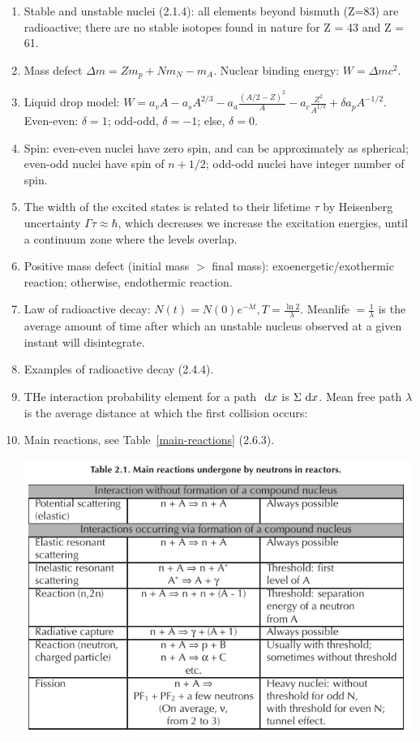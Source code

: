 \documentclass{school-22.211-notes}
\begin{document}
\begin{enumerate}
\item Stable and unstable nuclei (2.1.4): all elements beyond bismuth (Z=83) are radioactive; there are no stable isotopes found in nature for Z = 43 and Z = 61. 
\item Mass defect $\Delta m = Z m_p + N m_N - m_A$. Nuclear binding energy: $W = \Delta m c^2$. 
\item Liquid drop model: $W = a_v A - a_s A^{2/3} - a_a \frac{(A/2 - Z)^2}{A} - a_c \frac{Z^2}{A^{1/3}} + \delta a_p A^{-1/2}.$ Even-even: $\delta = 1$; odd-odd, $\delta = -1$; else, $\delta = 0$. 
\item Spin: even-even nuclei have zero spin, and can be approximately as spherical; even-odd nuclei have spin of $n+1/2$; odd-odd nuclei have integer number of spin. 
\item The width of the excited states is related to their lifetime $\tau$ by Heisenberg uncertainty $\Gamma \tau \approx \hbar$, which decreases we increase the excitation energies, until a continuum zone where the levels overlap. 
\item Positive mass defect (initial mass $>$ final mass): exoenergetic/exothermic reaction; otherwise, endothermic reaction. 
\item Law of radioactive decay: $N(t) = N(0) e^{-\lambda t}, T = \frac{\ln 2}{\lambda}$. Meanlife $=\frac{1}{\lambda}$ is the average amount of time after which an unstable nucleus observed at a given instant will disintegrate.  
\item Examples of radioactive decay (2.4.4).
\item THe interaction probability element for a path $\mbox{ }\mathrm{d} x$ is $\Sigma \mbox{ }\mathrm{d} x$. Mean free path $\lambda$ is the average distance at which the first collision occurs:
\item Main reactions, see Table~\ref{main-reactions} (2.6.3).
  \begin{table}
    \centering
    \includegraphics[width=5in]{images/intro/main-reactions.png}

\end{table}
\end{enumerate}
\end{document}
